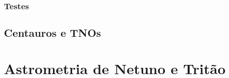 \documentclass[12pt,a4paper]{monografia}
\begin{document}
\subsection{Testes}


\section{Centauros e TNOs}
\label{Sec: TNOs}

\chapter{Astrometria de Netuno e Tritão}
\label{Cap: Netuno}



\glsaddall
\printglossary




\end{document}
